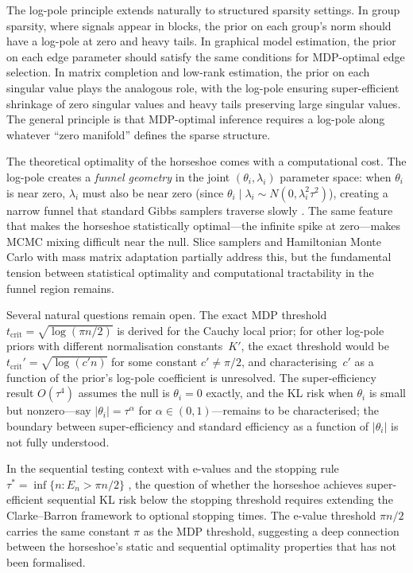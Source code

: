 \documentclass[12pt]{article}
\newcommand{\abs}[1]{\lvert #1 \rvert}
\newcommand{\tcrit}{t_{\mathrm{crit}}}
\begin{document}
The log-pole principle extends naturally to structured sparsity settings. In group sparsity, where signals appear in blocks, the prior on each group's norm should have a log-pole at zero and heavy tails. In graphical model estimation, the prior on each edge parameter should satisfy the same conditions for MDP-optimal edge selection. In matrix completion and low-rank estimation, the prior on each singular value plays the analogous role, with the log-pole ensuring super-efficient shrinkage of zero singular values and heavy tails preserving large singular values. The general principle is that MDP-optimal inference requires a log-pole along whatever ``zero manifold'' defines the sparse structure.

The theoretical optimality of the horseshoe comes with a computational cost. The log-pole creates a \emph{funnel geometry} in the joint $(\theta_i, \lambda_i)$ parameter space: when $\theta_i$ is near zero, $\lambda_i$ must also be near zero (since $\theta_i \mid \lambda_i \sim N(0, \lambda_i^2\tau^2)$), creating a narrow funnel that standard Gibbs samplers traverse slowly \citep{makalic2015simple}. The same feature that makes the horseshoe statistically optimal---the infinite spike at zero---makes MCMC mixing difficult near the null. Slice samplers and Hamiltonian Monte Carlo with mass matrix adaptation partially address this, but the fundamental tension between statistical optimality and computational tractability in the funnel region remains.

Several natural questions remain open. The exact MDP threshold $\tcrit = \sqrt{\log(\pi n/2)}$ is derived for the Cauchy local prior; for other log-pole priors with different normalisation constants~$K'$, the exact threshold would be $t_{\mathrm{crit}}' = \sqrt{\log(c' n)}$ for some constant $c' \neq \pi/2$, and characterising~$c'$ as a function of the prior's log-pole coefficient is unresolved. The super-efficiency result $O(\tau^4)$ assumes the null is $\theta_i = 0$ exactly, and the KL risk when $\theta_i$ is small but nonzero---say $\abs{\theta_i} = \tau^\alpha$ for $\alpha \in (0,1)$---remains to be characterised; the boundary between super-efficiency and standard efficiency as a function of $\abs{\theta_i}$ is not fully understood.

In the sequential testing context with e-values and the stopping rule $\tau^* = \inf\{n : E_n > \pi n/2\}$ \citep{polson2026bayes}, the question of whether the horseshoe achieves super-efficient sequential KL risk below the stopping threshold requires extending the Clarke--Barron framework to optional stopping times. The e-value threshold $\pi n/2$ carries the same constant $\pi$ as the MDP threshold, suggesting a deep connection between the horseshoe's static and sequential optimality properties that has not been formalised.
\end{document}
